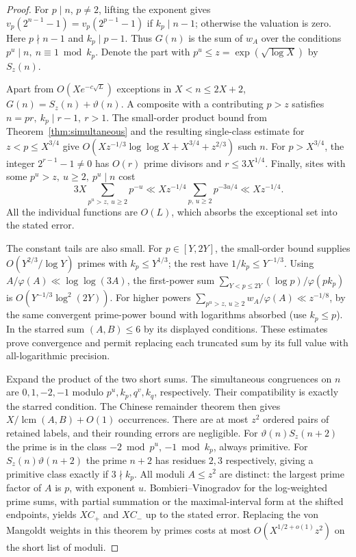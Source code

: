 \documentclass[11pt]{article}
\begin{document}
\begin{proof}
For \(p\mid n\), \(p\ne2\), lifting the exponent gives
\(v_p(2^{n-1}-1)=v_p(2^{p-1}-1)\) if \(k_p\mid n-1\);
otherwise the valuation is zero. Here \(p\nmid n-1\) and
\(k_p\mid p-1\). Thus \(G(n)\) is the sum of \(w_A\) over the
conditions \(p^u\mid n,\ n\equiv1\bmod k_p\). Denote the part with
\(p^u\le z=\exp(\sqrt{\log X})\) by \(S_z(n)\).

Apart from \(O(Xe^{-c\sqrt L})\) exceptions in \(X<n\le2X+2\),
\(G(n)=S_z(n)+\vartheta(n)\). A composite with a contributing
\(p>z\) satisfies \(n=pr,\ k_p\mid r-1,\ r>1\).
The small-order product bound from Theorem~\ref{thm:simultaneous}
and the resulting single-class estimate for \(z<p\le X^{3/4}\)
give \(O(Xz^{-1/3}\log\log X+X^{3/4}+z^{2/3})\) such \(n\).
For \(p>X^{3/4}\), the integer \(2^{r-1}-1\ne0\) has \(O(r)\)
prime divisors and \(r\le3X^{1/4}\). Finally, sites with some
\(p^u>z,\ u\ge2,\ p^u\mid n\) cost
\[
 3X\sum_{p^u>z,\ u\ge2}p^{-u}
 \ll X z^{-1/4}\sum_{p,\,u\ge2}p^{-3u/4}\ll X z^{-1/4}.
\]
All the individual functions are \(O(L)\), which absorbs the
exceptional set into the stated error.

The constant tails are also small. For \(p\in[Y,2Y]\), the
small-order bound supplies \(O(Y^{2/3}/\log Y)\) primes with
\(k_p\le Y^{1/3}\); the rest have \(1/k_p\le Y^{-1/3}\).
Using \(A/\varphi(A)\ll\log\log(3A)\), the first-power sum
\(\sum_{Y<p\le2Y}(\log p)/\varphi(pk_p)\) is
\(O(Y^{-1/3}\log^2(2Y))\).
For higher powers \(\sum_{p^u>z,\,u\ge2}w_A/\varphi(A)
\ll z^{-1/8}\), by the same convergent prime-power bound with
logarithms absorbed (use \(k_p\le p\)).
In the starred sum \((A,B)\le6\) by its displayed conditions.
These estimates prove convergence and permit replacing each
truncated sum by its full value with all-logarithmic precision.

Expand the product of the two short sums. The simultaneous
congruences on \(n\) are \(0,1,-2,-1\) modulo \(p^u,k_p,q^v,k_q\),
respectively. Their compatibility is exactly the starred condition.
The Chinese remainder theorem then gives
\(X/\operatorname{lcm}(A,B)+O(1)\) occurrences.
There are at most \(z^2\) ordered pairs of retained labels, and their
rounding errors are negligible. For
\(\vartheta(n)S_z(n+2)\) the prime is in the class \(-2\bmod p^u\),
\(-1\bmod k_p\), always primitive. For
\(S_z(n)\vartheta(n+2)\) the prime \(n+2\) has residues \(2,3\)
respectively, giving a primitive class exactly if \(3\nmid k_p\).
All moduli \(A\le z^2\) are distinct: the largest prime factor
of \(A\) is \(p\), with exponent \(u\). Bombieri--Vinogradov
\cite{BV} for the log-weighted prime sums, with partial summation
or the maximal-interval form at the shifted endpoints, yields
\(X C_+\) and \(X C_-\) up to the stated error. Replacing the
von Mangoldt weights in this theorem by primes costs at most
\(O(X^{1/2+o(1)}z^2)\) on the short list of moduli.
\end{proof}
\end{document}
